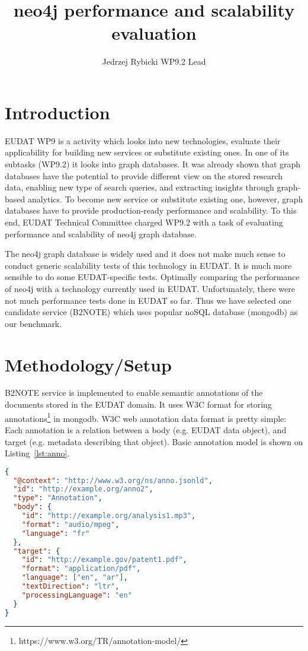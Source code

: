 \documentclass[a4paper,10pt]{article}
\title{neo4j performance and scalability evaluation}
\author{Jedrzej Rybicki WP9.2 Lead}
\begin{document}
\maketitle

\section{Introduction}
EUDAT WP9 is a activity which looks into new technologies, evaluate their 
applicability for building new services or substitute existing ones. In one of 
its subtasks (WP9.2) it looks into graph databases. It was already shown that 
graph databases have the potential to provide different view on the stored 
research data, enabling new type of search queries, and extracting insights 
through graph-based analytics. To become new service or substitute existing
one, however, graph databases have to provide production-ready performance and
scalability. To this end, EUDAT Technical Committee charged WP9.2 with a task 
of evaluating performance and scalability of neo4j graph database.

The neo4j graph database is widely used and it does not make much sense to 
conduct generic scalability tests of this technology in EUDAT. It is much
more sensible to do some EUDAT-specific tests. Optimally comparing the 
performance of neo4j with a technology currently used in EUDAT. Unfortunately,
there were not much performance tests done in EUDAT so far. Thus we have
selected one candidate service (B2NOTE) which uses popular noSQL database (mongodb)
as our benchmark. 

\section{Methodology/Setup}
B2NOTE service is implemented to enable semantic annotations of the documents 
stored in the EUDAT domain. It uses W3C format for storing 
annotations\footnote{https://www.w3.org/TR/annotation-model/} in mongodb. W3C 
web annotation data format is pretty simple: Each annotation is a relation 
between a body (e.g. EUDAT data object), and target (e.g. metadata describing 
that object). Basic annotation model is shown on Listing~\ref{lst:anno}.

\begin{lstlisting}[language=json,frame=single,caption=Basic W3C annotation data model,label=lst:anno]
{
  "@context": "http://www.w3.org/ns/anno.jsonld",
  "id": "http://example.org/anno2",
  "type": "Annotation",
  "body": {
    "id": "http://example.org/analysis1.mp3",
    "format": "audio/mpeg",
    "language": "fr"
  },
  "target": {
    "id": "http://example.gov/patent1.pdf",
    "format": "application/pdf",
    "language": ["en", "ar"],
    "textDirection": "ltr",
    "processingLanguage": "en"
  }
}
\end{lstlisting}
\end{document}
